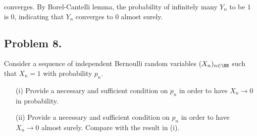 converges. By Borel-Cantelli lemma, the probability of infinitely many $Y_n$ to be $1$ is $0$, indicating that $Y_n$ converges to $0$ almost surely.

\subsection*{Problem 8.} Consider a sequence of independent Bernoulli random variables $(X_n)_{n\in\NN}$ such that $X_n = 1$ with probability $p_n$.
\begin{enumerate}
    \item [(i)] Provide a necessary and sufficient condition on $p_n$ in order to have $X_n \to 0$ in probability.
    \item [(ii)] Provide a necessary and sufficient condition on $p_n$ in order to have $X_n \to 0$ almost surely. Compare with the result in (i).
\end{enumerate}


